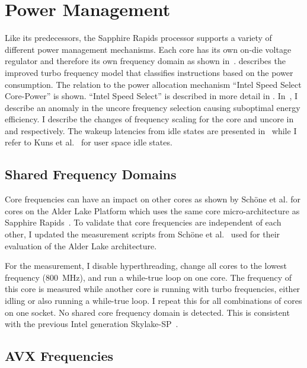 \chapter{Power Management}
\label{sec:power_management}

Like its predecessors, the Sapphire Rapids processor supports a variety of different power management mechanisms.
Each core has its own on-die voltage regulator and therefore its own frequency domain as shown in~.
 describes the improved turbo frequency model that classifies instructions based on the power consumption.
The relation to the power allocation mechanism ``Intel Speed Select Core-Power'' is shown.
``Intel Speed Select'' is described in more detail in .
In~, I describe an anomaly in the uncore frequency selection causing suboptimal energy efficiency.
I describe the changes of frequency scaling for the core and uncore in~ and  respectively.
The wakeup latencies from idle states are presented in~ while I refer to Kuns et al.~\cite{Kuns_2025_UserSpaceIdle} for user space idle states.

\section{Shared Frequency Domains}
\label{sec:shared_freq_domains}
Core frequencies can have an impact on other cores as shown by Schöne et al. for cores on the Alder Lake Platform which uses the same core micro-architecture as Sapphire Rapids~\cite{Schoene_2024_Alder_Lake}.
To validate that core frequencies are independent of each other, I updated the measurement scripts from Sch\"one et al.~\cite{Schoene_2024_Alder_Lake} used for their evaluation of the Alder Lake architecture.

For the measurement, I disable hyperthreading, change all cores to the lowest frequency (\SI{800}{\MHz}), and run a while-true loop on one core.
The frequency of this core is measured while another core is running with turbo frequencies, either idling or also running a while-true loop.
I repeat this for all combinations of cores on one socket.
No shared core frequency domain is detected.
This is consistent with the previous Intel generation Skylake-SP~\cite[Sec. 2.6.3]{Intel_Optimization_Reference_Manual_050}.

\section{AVX Frequencies}
\label{sec:avx-frequencies}

